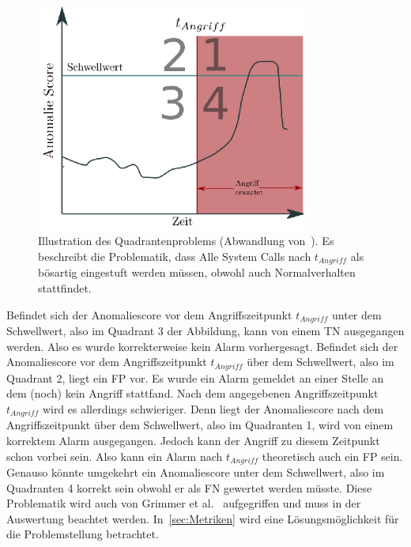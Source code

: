                     \begin{figure}[ht]
                        \centering
                        \includegraphics[width=0.8\textwidth]{images/q_problem.eps}
                        \caption[Quadrantenproblem]{Illustration des Quadrantenproblems (Abwandlung von~\cite{IDSTHREADGRIMMER2021}).
                        Es beschreibt die Problematik, dass Alle System Calls nach $t_{Angriff}$ als bösartig eingestuft werden müssen, obwohl auch Normalverhalten stattfindet.}
                        \label{fig:quadrant}
                    \end{figure}

                    Befindet sich der Anomaliescore vor dem Angriffszeitpunkt $t_{Angriff}$ unter dem Schwellwert, also im Quadrant 3 der Abbildung, kann von einem \ac{TN} ausgegangen werden.
                    Also es wurde korrekterweise kein Alarm vorhergesagt.
                    Befindet sich der Anomaliescore vor dem Angriffszeitpunkt $t_{Angriff}$ über dem Schwellwert, also im Quadrant 2, liegt ein \ac{FP} vor.
                    Es wurde ein Alarm gemeldet an einer Stelle an dem (noch) kein Angriff stattfand.
                    Nach dem angegebenen Angriffszeitpunkt $t_{Angriff}$ wird es allerdings schwieriger.
                    Denn liegt der Anomaliescore nach dem Angriffszeitpunkt über dem Schwellwert, also im Quadranten 1, wird von einem korrektem Alarm ausgegangen.
                    Jedoch kann der Angriff zu diesem Zeitpunkt schon vorbei sein.
                    Also kann ein Alarm nach $t_{Angriff}$ theoretisch auch ein \ac{FP} sein. 
                    Genauso könnte umgekehrt ein Anomaliescore unter dem Schwellwert, also im Quadranten 4 korrekt sein obwohl er als \ac{FN} gewertet werden müsste.
                    Diese Problematik wird auch von Grimmer et al.~\cite{IDSTHREADGRIMMER2021} aufgegriffen und muss in der Auswertung beachtet werden. 
                    In~\autoref{sec:Metriken} wird eine Lösungsmöglichkeit für die Problemstellung betrachtet.


